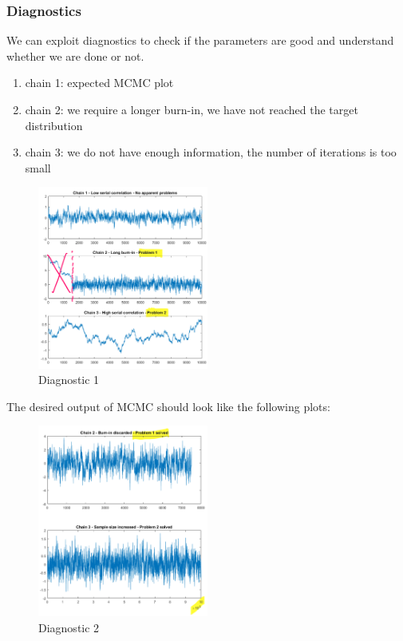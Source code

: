 \subsubsection{Diagnostics}

We can exploit diagnostics to check if the parameters are good and
understand whether we are done or not.

\begin{enumerate}
\def\labelenumi{\arabic{enumi}.}
\tightlist
\item
  chain 1: expected MCMC plot
\item
  chain 2: we require a longer burn-in, we have not reached the target
  distribution
\item
  chain 3: we do not have enough information, the number of iterations
  is too small
\end{enumerate}

\begin{figure}
\centering
\includegraphics[width=0.5\textwidth]{diag_1.png}
\caption{Diagnostic 1}
\end{figure}
\noindent
The desired output of MCMC should look like the following plots:

\begin{figure}
\centering
\includegraphics[width=0.5\textwidth]{diag_2.png}
\caption{Diagnostic 2}
\end{figure}

